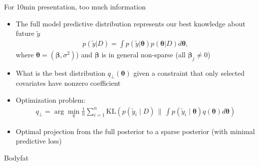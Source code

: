 \documentclass[english,t]{beamer}
\newcommand{\KLx}[2] { \mathrm{KL} {\left(#1 \, \| \, #2\right)} }
\newcommand{\vs}[1] { \boldsymbol{#1} }
\begin{document}
\begin{frame}

  {\Large\color{red} {For 10min presentation, too much information}}


\begin{itemize}
    \color{gray}
\item The full model predictive distribution represents our best knowledge about future $\tilde{y}$
	\begin{align*}
          p(\tilde{y} | D) = \int p(\tilde{y} | \vs\theta) p(\vs \theta| D) d\vs\theta,
        \end{align*}
        where $\vs \theta=(\vs \beta,\sigma^2)$) and $\vs \beta$ is in general non-sparse (all $\vs\beta_j \ne 0$)
	\item What is the best distribution $q_\perp(\vs \theta)$ given a
          constraint that only selected covariates have nonzero coefficient
	\item Optimization problem:
	\begin{align*}
		q_\perp = \arg \min_{q} \frac{1}{n} \sum_{i=1}^n 
			\KLx{p(\tilde{y}_i \mid D)}{\int p(\tilde{y}_i \mid \vs \theta) q(\vs \theta) d\vs\theta}%
	\end{align*}
      \item Optimal projection from the full posterior to a sparse
        posterior (with minimal predictive loss)
\end{itemize}


\end{frame}


\begin{frame}
  
  {\Large\color{navyblue} Bodyfat}

  

\end{frame}
\end{document}
